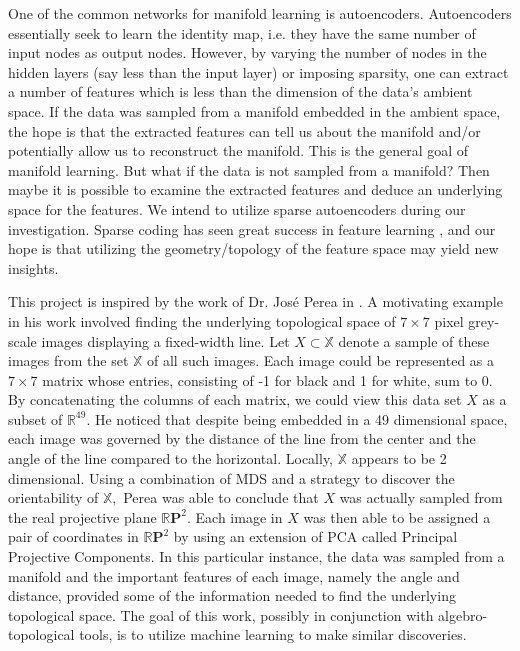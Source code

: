 \documentclass[sigconf]{acmart}
\newcommand\mb[1]{\mathbb{#1}}
\begin{document}
	One of the common networks for manifold learning is autoencoders. Autoencoders essentially seek to learn the identity map, i.e. they have the same number of input nodes as output nodes. However, by varying the number of nodes in the hidden layers (say less than the input layer) or imposing sparsity, one can extract a number of features which is less than the dimension of the data's ambient space. If the data was sampled from a manifold embedded in the ambient space, the hope is that the extracted features can tell us about the manifold and/or potentially allow us to reconstruct the manifold. This is the general goal of manifold learning. But what if the data is not sampled from a manifold? Then maybe it is possible to examine the extracted features and deduce an underlying space for the features. We intend to utilize sparse autoencoders during our investigation. Sparse coding has seen great success in feature learning \cite{he2014unsupervised}, and our hope is that utilizing the geometry/topology of the feature space may yield new insights.
	
	This project is inspired by the work of Dr. Jos{\'e} Perea in \cite{perea}. A motivating example in his work involved finding the underlying topological space of $7\times 7$ pixel grey-scale images displaying a fixed-width line. Let $X\subset\mb{X}$ denote a sample of these images from the set $\mb{X}$ of all such images. Each image could be represented as a $7\times 7$ matrix whose entries, consisting of -1 for black and 1 for white, sum to 0. By concatenating the columns of each matrix, we could view this data set $X$ as a subset of $\mb{R}^{49}.$ He noticed that despite being embedded in a 49 dimensional space, each image was governed by the distance of the line from the center and the angle of the line compared to the horizontal. Locally, $\mb{X}$ appears to be 2 dimensional. Using a combination of MDS and a strategy to discover the orientability of $\mb{X},$ Perea was able to conclude that $X$ was actually sampled from the real projective plane $\mb{R}\textbf{P}^2.$ Each image in $X$ was then able to be assigned a pair of coordinates in $\mb{R}\textbf{P}^2$ by using an extension of PCA called Principal Projective Components. In this particular instance, the data was sampled from a manifold and the important features of each image, namely the angle and distance, provided some of the information needed to find the underlying topological space. The goal of this work, possibly in conjunction with algebro-topological tools, is to utilize machine learning to make similar discoveries.
	
\end{document}
